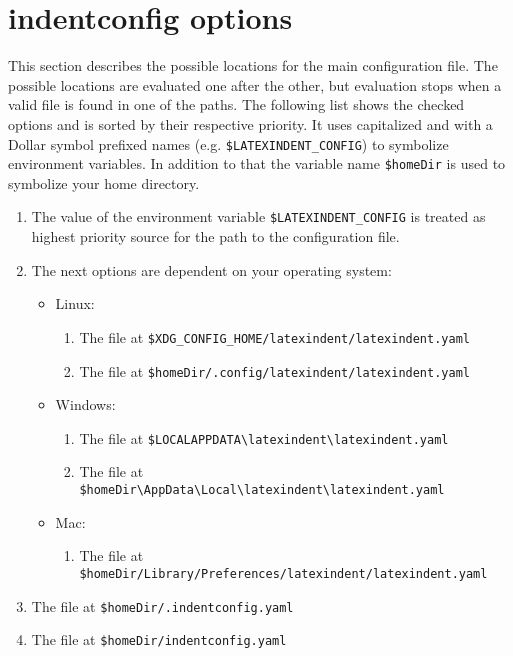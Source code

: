  \section{indentconfig options}
  This section describes the possible locations for the main configuration file.
  The possible locations are evaluated one after the other, but evaluation stops
  when a valid file is found in one of the paths. The following list shows the checked options and is sorted by their respective priority.
  It uses capitalized and with a Dollar symbol prefixed names (e.g. \texttt{\$LATEXINDENT\_CONFIG}) to symbolize environment variables.
  In addition to that the variable name \texttt{\$homeDir} is used to symbolize your home directory.
  \begin{enumerate}
      \item The value of the environment variable \texttt{\$LATEXINDENT\_CONFIG} is treated as highest priority source for the path to the configuration file.
      \item The next options are dependent on your operating system:
        \begin{itemize}
          \item Linux:
              \begin{enumerate}
                  \item The file at \texttt{\$XDG\_CONFIG\_HOME/latexindent/latexindent.yaml}
                  \item The file at \texttt{\$homeDir/.config/latexindent/latexindent.yaml}
              \end{enumerate}
          \item Windows:
              \begin{enumerate}
                  \item The file at \texttt{\$LOCALAPPDATA\textbackslash{}latexindent\textbackslash{}latexindent.yaml}
                  \item The file at \texttt{\$homeDir\textbackslash{}AppData\textbackslash{}Local\textbackslash{}latexindent\textbackslash{}latexindent.yaml}
              \end{enumerate}
          \item Mac:
              \begin{enumerate}
                  \item The file at \texttt{\$homeDir/Library/Preferences/latexindent/latexindent.yaml}
              \end{enumerate}
        \end{itemize}
    \item The file at \texttt{\$homeDir/.indentconfig.yaml}
    \item The file at \texttt{\$homeDir/indentconfig.yaml}
  \end{enumerate}
